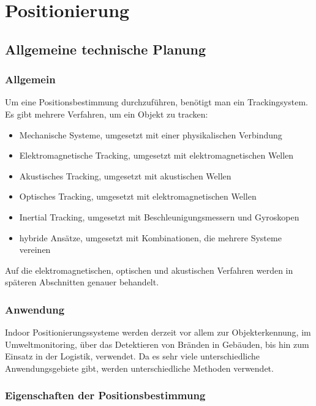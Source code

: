 \chapter{Positionierung}
\renewcommand{\kapitelautor}{Autor: Christina Bornberg, Lucas Ullrich}

\section{Allgemeine technische Planung}

    \subsection{Allgemein}
    Um eine Positionsbestimmung durchzuführen, benötigt man ein Trackingsystem. 
    Es gibt mehrere Verfahren, um ein Objekt zu tracken: \cite{PositionAllg}
    \begin{itemize}
    \item Mechanische Systeme, umgesetzt mit einer physikalischen Verbindung
    \item Elektromagnetische Tracking, umgesetzt mit elektromagnetischen Wellen
    \item Akustisches Tracking, umgesetzt mit akustischen Wellen
    \item Optisches Tracking, umgesetzt mit elektromagnetischen Wellen
    \item Inertial Tracking, umgesetzt mit Beschleunigungsmessern und Gyroskopen
    \item hybride Ansätze, umgesetzt mit Kombinationen, die mehrere Systeme vereinen
    \end{itemize}   
    Auf die elektromagnetischen, optischen und akustischen Verfahren werden in späteren Abschnitten genauer behandelt.

    \subsection{Anwendung} 
    Indoor Positionierungssysteme werden derzeit vor allem zur Objekterkennung, im Umweltmonitoring, über das Detektieren von Bränden in Gebäuden, bis hin zum Einsatz in der Logistik, verwendet. Da es sehr viele unterschiedliche Anwendungsgebiete gibt, werden unterschiedliche Methoden verwendet. \cite{posAnwendung}

    \subsection{Eigenschaften der Positionsbestimmung}

